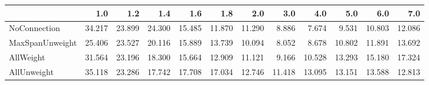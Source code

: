 \begin{tabular}{lrrrrrrrrrrr}
\toprule
{} &    1.0 &    1.2 &    1.4 &    1.6 &    1.8 &    2.0 &    3.0 &    4.0 &    5.0 &    6.0 &    7.0 \\
\midrule
NoConnection    & 34.217 & 23.899 & 24.300 & 15.485 & 11.870 & 11.290 &  8.886 &  7.674 &  9.531 & 10.803 & 12.086 \\
MaxSpanUnweight & 25.406 & 23.527 & 20.116 & 15.889 & 13.739 & 10.094 &  8.052 &  8.678 & 10.802 & 11.891 & 13.692 \\
AllWeight       & 31.564 & 23.196 & 18.300 & 15.664 & 12.909 & 11.121 &  9.166 & 10.528 & 13.293 & 15.180 & 17.324 \\
AllUnweight     & 35.118 & 23.286 & 17.742 & 17.708 & 17.034 & 12.746 & 11.418 & 13.095 & 13.151 & 13.588 & 12.813 \\
\bottomrule
\end{tabular}
